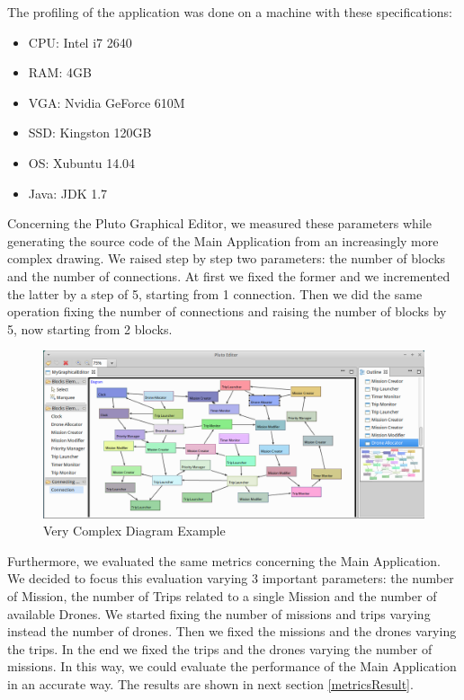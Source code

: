 The profiling of the application was done on a machine with these specifications:

\begin{itemize}
\item CPU: Intel i7 2640
\item RAM: 4GB
\item VGA: Nvidia GeForce 610M
\item SSD: Kingston 120GB
\item OS: Xubuntu 14.04
\item Java: JDK 1.7
\end{itemize}

Concerning the Pluto Graphical Editor, we measured these parameters while generating the source code of the Main Application from an increasingly more complex drawing. 
We raised step by step two parameters: the number of blocks and the number of connections.
At first we fixed the former and we incremented the latter by a step of 5, starting from 1 connection. Then we did the same operation fixing the number of connections and raising the number of blocks by 5, now starting from 2 blocks.

\begin{figure}[H]
  \centering
  \includegraphics[width=\linewidth]{pictures/stressDiagram.png}
  \caption{Very Complex Diagram Example}
  \label{fig:stressDiagram}
\end{figure}

Furthermore, we evaluated the same metrics concerning the Main Application.
We decided to focus this evaluation varying 3 important parameters: the number of Mission, the number of Trips related to a single Mission and the number of available Drones. 
We started fixing the number of missions and trips varying instead the number of drones. Then we fixed the missions and the drones varying the trips. In the end we fixed the trips and the drones varying the number of missions.
In this way, we could evaluate the performance of the Main Application in an accurate way.
The results are shown in next section \ref{metricsResult}.

